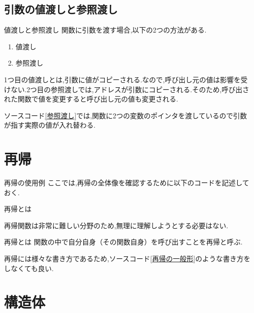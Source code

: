 \subsection{引数の値渡しと参照渡し}
\begin{frame}[fragile]{値渡しと参照渡し}
    関数に引数を渡す場合,以下の2つの方法がある.
    \begin{enumerate}
        \item 値渡し
        \item 参照渡し
    \end{enumerate}
    1つ目の値渡しとは,引数に値がコピーされる.なので,呼び出し元の値は影響を受けない.2つ目の参照渡しでは,アドレスが引数にコピーされる.そのため,呼び出された関数で値を変更すると呼び出し元の値も変更される.
    
    ソースコード\ref{参照渡し}では,関数に2つの変数のポインタを渡しているので引数が指す実際の値が入れ替わる.
\end{frame}
\section{再帰}
\begin{frame}[fragile]{再帰の使用例}
ここでは,再帰の全体像を確認するために以下のコードを記述しておく.
    \begin{minipage}{\linewidth}
        
    \end{minipage}
\end{frame}
\begin{frame}[fragile]{再帰とは}
    \begin{alertblock}{}
        再帰関数は非常に難しい分野のため,無理に理解しようとする必要はない.
    \end{alertblock}
    \begin{block}{再帰とは}
        関数の中で自分自身（その関数自身）を呼び出すことを再帰と呼ぶ.
    \end{block}
    
    \begin{alertblock}{}
        再帰には様々な書き方であるため,ソースコード\ref{再帰の一般形}のような書き方をしなくても良い.
    \end{alertblock}
\end{frame}

\section{構造体}

